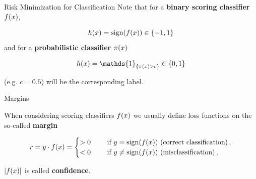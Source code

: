 \begin{vbframe}{Risk Minimization for Classification}
Note that for a \textbf{binary scoring classifier} $f(x)$,

$$
h(x) = \operatorname{sign}(f(x)) \in \{-1, 1\}
$$
and for a \textbf{probabilistic classifier} $\pi(x)$

$$
\hx = \mathds{1}_{\{ \pix > c \}} \in \{0, 1\}
$$

(e.g. $c = 0.5$) will be the corresponding label. 


\end{vbframe}

\begin{vbframe}{Margins} 

When considering scoring classifiers $f(x)$ we usually define loss functions on the so-called \textbf{margin}

$$
r = y\cdot f(x) =  \begin{cases} > 0  \quad &\text{ if } y = \operatorname{sign}(f(x)) \text{ (correct classification)}\,, \\
                      < 0 \quad &\text{ if } y \ne \operatorname{sign}(f(x)) \text{ (misclassification)}\,, \end{cases}
$$

$|f(x)|$ is called \textbf{confidence}.








\end{vbframe}

